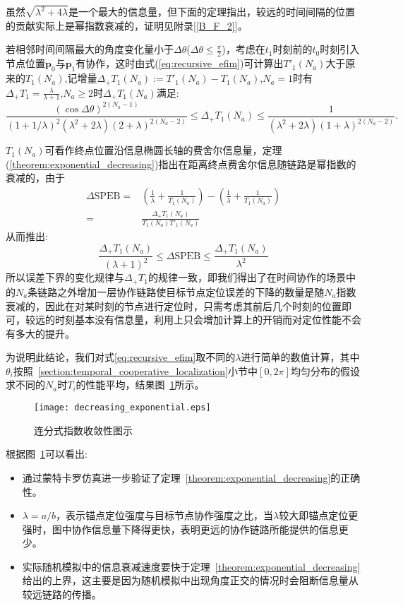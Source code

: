 虽然$\sqrt{\lambda^2+4\lambda}$是一个最大的信息量，但下面的定理指出，较远的时间间隔的位置的贡献实际上是幂指数衰减的，证明见附录[\ref{B_F_2}]。
\begin{theorem}\label{theorem:exponential_decreasing}
若相邻时间间隔最大的角度变化量小于$\Delta \theta$($\Delta \theta \leq \frac{\pi}{2}$)，考虑在$t_1$时刻前的$t_0$时刻引入节点位置$\bm{p}_0$与$\bm{p}_1$有协作，这时由式(\ref{eq:recursive_efim})可计算出$T'_1(N_a)$大于原来的$T_1(N_a)$,记增量$\Delta_+ T_1(N_a):=T'_1(N_a)-T_1(N_a)$,$N_a=1$时有$\Delta_{+} T_{1}=\frac{\lambda}{\lambda+1}$,$N_a\geq 2$时$\Delta_+ T_1(N_a)$满足:
\begin{equation}
\frac{(\cos\Delta\theta)^{2(N_a-1)}}{(1+1/\lambda)^2(\lambda^2+2\lambda)(2+\lambda)^{2(N_a-2)}}\leq \Delta_+ T_1(N_a)\leq\frac{1}{(\lambda^2+2\lambda)(1+\lambda)^{2(N_a-2)}}.
\end{equation}
\end{theorem}
\begin{remark}

$T_1(N_a)$可看作终点位置沿信息椭圆长轴的费舍尔信息量，定理(\ref{theorem:exponential_decreasing})指出在距离终点费舍尔信息随链路是幂指数的衰减的，由于
\begin{align*}
  \Delta \text{SPEB}=&(\frac{1}{\lambda}+\frac{1}{T_1(N_a)})-(\frac{1}{\lambda}+\frac{1}{T_1(N_a)})\\
  =&\frac{\Delta_+ T_1(N_a)}{T_1(N_a)T'_1(N_a)}
\end{align*}
从而推出:
\begin{equation}
\frac{\Delta_+ T_1(N_a)}{(\lambda+1)^2}\leq  \Delta \text{SPEB} \leq \frac{\Delta_+ T_1(N_a)}{\lambda^2}
\end{equation}
所以误差下界的变化规律与$\Delta_{+} T_{1}$的规律一致，即我们得出了在时间协作的场景中的$N_a$条链路之外增加一层协作链路使目标节点定位误差的下降的数量是随$N_a$指数衰减的，因此在对某时刻的节点进行定位时，只需考虑其前后几个时刻的位置即可，较远的时刻基本没有信息量，利用上只会增加计算上的开销而对定位性能不会有多大的提升。
\end{remark}


为说明此结论，我们对式\ref{eq:recursive_efim}取不同的$\lambda$进行简单的数值计算，其中$\theta_i$按照~\ref{section:temporal_cooperative_localization}小节中$[0,2\pi]$均匀分布的假设求不同的$N_a$时$T_i$的性能平均，结果图~\ref{fig:continuous_fraction_exponential}所示。
\begin{figure}
  \centering
  \texttt{[image: decreasing\_exponential.eps]}
  \caption{连分式指数收敛性图示}\label{fig:continuous_fraction_exponential}
\end{figure}
根据图~\ref{fig:continuous_fraction_exponential}可以看出:
\begin{itemize}
\item 通过蒙特卡罗仿真进一步验证了定理~\ref{theorem:exponential_decreasing}的正确性。
\item $\lambda=a/b$，表示锚点定位强度与目标节点协作强度之比，当$\lambda$较大即锚点定位更强时，图中协作信息量下降得更快，表明更远的协作链路所能提供的信息更少。
\item 实际随机模拟中的信息衰减速度要快于定理~\ref{theorem:exponential_decreasing}给出的上界，这主要是因为随机模拟中出现角度正交的情况时会阻断信息量从较远链路的传播。\end{itemize}

